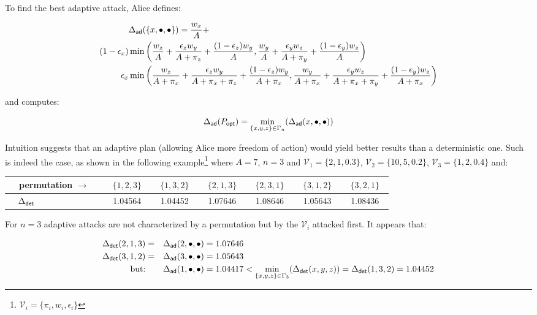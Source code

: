 \documentclass[11pt]{llncs}
\begin{document}
To find the best adaptive attack, Alice defines:

\begin{alignat*}{10}
&\Delta_{\mbox{\scriptsize {\sf ad}}}(\{x,\bullet,\bullet\})=\frac{w_x}{A}+ \\
(1-\epsilon_x) & \min\bigg(\frac{w_z}{A}+\frac{\epsilon_z w_y}{A+\pi_z}+\frac{(1-\epsilon_z) w_y}{A},\frac{w_y}{A}+\frac{\epsilon_y w_z}{A+\pi_y}+\frac{(1-\epsilon_y) w_z}{A}\bigg)\\
\epsilon_x     & \min\bigg(\frac{w_z}{A+\pi_x}+\frac{\epsilon_z w_y}{A+\pi_x+\pi_z}+\frac{(1-\epsilon_z) w_y}{A+\pi_x},\frac{w_y}{A+\pi_x}+\frac{\epsilon_y w_z}{A+\pi_x+\pi_y}+\frac{(1-\epsilon_y) w_z}{A+\pi_x}\bigg)\\
\end{alignat*}

and computes:

$$
\Delta_{\mbox{\scriptsize {\sf ad}}}(P_{\mbox{\scriptsize {\sf opt}}})
= \min_{\{x,y,z\}\in\Gamma_n}(\Delta_{\mbox{\scriptsize {\sf ad}}}(x,\bullet,\bullet))$$

Intuition suggests that an adaptive plan (allowing Alice more freedom of action) would yield better results than a deterministic one. Such is indeed the case, as shown in the following example\footnote{$\mathcal{V}_i=\{\pi_i,w_i,\epsilon_i\}$} where $A=7$, $n=3$ and $\mathcal{V}_1=\{2,1,0.3\}$, $\mathcal{V}_2=\{10,5,0.2\}$, $\mathcal{V}_3=\{1,2,0.4\}$ and:\smallskip

\begin{center}
\begin{tabular}{|l|c|c|c|c|c|c|}\hline
~~permutation $\rightarrow$~~&~$\{1,2,3\}$~&~$\{1,3,2\}$~&~$\{2,1,3\}$~&~$\{2,3,1\}$~&~$\{3,1,2\}$~&~$\{3,2,1\}$~\\\hline
~~$\Delta_{\mbox{\scriptsize {\sf det}}}$&  1.04564 &  1.04452 &   1.07646 & 1.08646  & 1.05643  & 1.08436 \\\hline
\end{tabular}
\end{center}

For $n=3$ adaptive attacks are not characterized by a permutation but by the $\mathcal{V}_i$ attacked first. It appears that:

\begin{alignat*}{10}
\Delta_{\mbox{\scriptsize {\sf det}}}(2,1,3)&=&\Delta_{\mbox{\scriptsize {\sf ad}}}(2,\bullet,\bullet)&=1.07646\\
\Delta_{\mbox{\scriptsize {\sf det}}}(3,1,2)&=&\Delta_{\mbox{\scriptsize {\sf ad}}}(3,\bullet,\bullet)&=1.05643\\
\mbox{but:}                                 & &\Delta_{\mbox{\scriptsize {\sf ad}}}(1,\bullet,\bullet)&=1.04417<\min_{\{x,y,z\}\in\Gamma_3}(\Delta_{\mbox{\scriptsize {\sf det}}}(x,y,z))=\Delta_{\mbox{\scriptsize {\sf det}}}(1,3,2)=1.04452\\
\end{alignat*}
\smallskip
\end{document}
